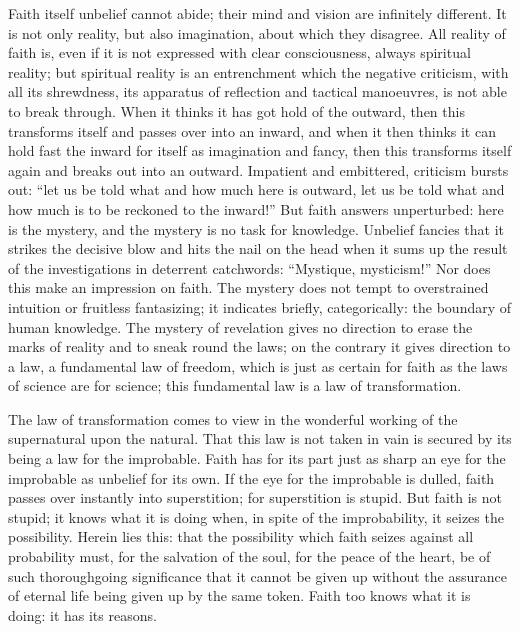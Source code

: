 \documentclass[12pt,a4paper,openany]{book}
\newcommand{\opage}[1]{\marginnote{\footnotesize\textit{[#1]}}}
\begin{document}
Faith itself unbelief cannot abide; their
mind and vision are infinitely different. It is not only
reality, but also imagination, about which they
disagree. All reality of faith is, even if it is not
expressed with clear consciousness, always spiritual reality;
but spiritual reality is an entrenchment which the
negative criticism, with all its shrewdness, its apparatus of reflection
and tactical manoeuvres, is not able to
break through. When it thinks it has got hold of
the outward, then this transforms itself and passes over into an
inward, and when it then thinks it can hold fast
the inward for itself as imagination and fancy,
then this transforms itself again and breaks out into an outward.
Impatient and embittered, criticism bursts out: ``let
us be told what and how much here is outward,
let us be told what and how much is to be reckoned
to the inward!'' But faith answers unperturbed:
here is the mystery, and the mystery is no task for
knowledge. Unbelief fancies that it strikes the decisive blow
and hits the nail on the head when it sums up
the result of the investigations in deterrent
catchwords: ``Mystique, mysticism!'' Nor does this make
an impression on faith. The mystery does not tempt to
\setcounter{footnote}{0}%
\opage{72}overstrained intuition or fruitless fantasizing; it indicates
briefly, categorically: the boundary of human knowledge.
The mystery of revelation gives no direction to
erase the marks of reality and to sneak round
the laws; on the contrary it gives direction to a law, a
fundamental law of freedom, which is just as certain for faith
as the laws of science are for science; this
fundamental law is a law of transformation.

The law of transformation comes to view in the wonderful
working of the supernatural upon the natural. That this
law is not taken in vain is secured by its
being a law for the improbable. Faith has for its
part just as sharp an eye for the improbable as
unbelief for its own. If the eye for the improbable is dulled,
faith passes over instantly into superstition; for superstition
is stupid. But faith is not stupid; it knows what it
is doing when, in spite of the improbability, it seizes the possibility.
Herein lies this: that the possibility which faith seizes against all
probability must, for the salvation of the soul, for the
peace of the heart, be of such thoroughgoing significance that
it cannot be given up without the assurance of
eternal life being given up by the same token. Faith too
knows what it is doing: it has its reasons.
\end{document}
